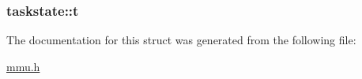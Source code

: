 \subsubsection[{\texorpdfstring{t}{t}}]{ taskstate\+::t}\hypertarget{structtaskstate_ad9d64e6139f851a3f8d2275f2748fae5}{}\label{structtaskstate_ad9d64e6139f851a3f8d2275f2748fae5}


The documentation for this struct was generated from the following file\+:\begin{DoxyCompactItemize}
\item 
\hyperlink{mmu_8h}{mmu.\+h}\end{DoxyCompactItemize}
